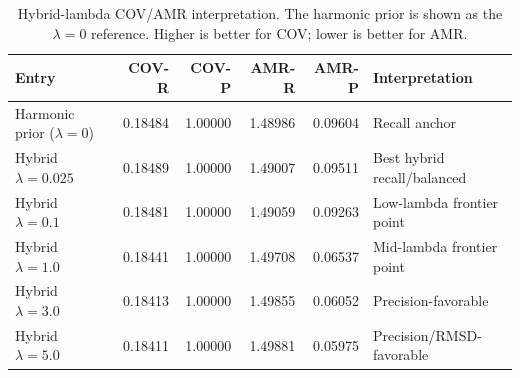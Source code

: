 \begin{table}[t]
\centering
\small
\caption{Hybrid-lambda COV/AMR interpretation. The harmonic prior is shown as the $\lambda=0$ reference. Higher is better for COV; lower is better for AMR.}
\label{tab:lambda-interpretation}
\begin{tabular}{lrrrrl}
\toprule
Entry & COV-R & COV-P & AMR-R & AMR-P & Interpretation \\
\midrule
Harmonic prior ($\lambda=0$) & 0.18484 & 1.00000 & 1.48986 & 0.09604 & Recall anchor \\
Hybrid $\lambda=0.025$ & 0.18489 & 1.00000 & 1.49007 & 0.09511 & Best hybrid recall/balanced \\
Hybrid $\lambda=0.1$ & 0.18481 & 1.00000 & 1.49059 & 0.09263 & Low-lambda frontier point \\
Hybrid $\lambda=1.0$ & 0.18441 & 1.00000 & 1.49708 & 0.06537 & Mid-lambda frontier point \\
Hybrid $\lambda=3.0$ & 0.18413 & 1.00000 & 1.49855 & 0.06052 & Precision-favorable \\
Hybrid $\lambda=5.0$ & 0.18411 & 1.00000 & 1.49881 & 0.05975 & Precision/RMSD-favorable \\
\bottomrule
\end{tabular}
\end{table}
